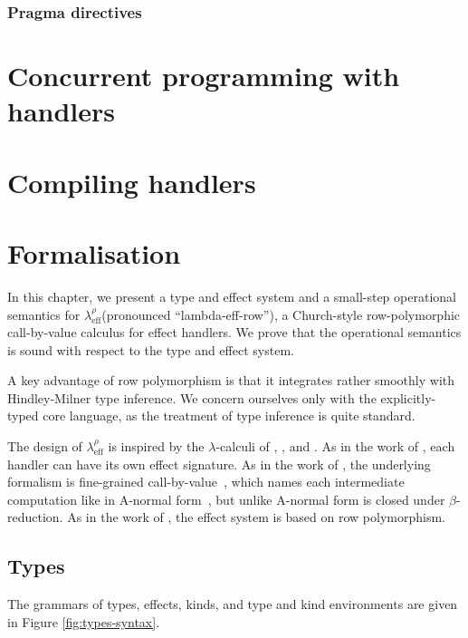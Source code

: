 \documentclass[mscres,icsa,lfcs,twoside,openright,logo,rightchapter,normalheadings]{infthesis}
\theoremstyle{definition}
\newcommand{\Calc}{\ensuremath{\lambda_{\text{eff}}^\rho}\xspace}
\begin{document}
\subsection{Pragma directives}


\chapter{Concurrent programming with handlers}

\chapter{Compiling handlers}

\chapter{Formalisation}
In this chapter, we present a type and effect system and a small-step
operational semantics for \Calc (pronounced ``lambda-eff-row''), a
Church-style row-polymorphic call-by-value calculus for effect
handlers.
%
We prove that the operational semantics is sound with respect to the
type and effect system.

A key advantage of row polymorphism is that it integrates rather
smoothly with Hindley-Milner type inference. We concern ourselves only
with the explicitly-typed core language, as the treatment of type
inference is quite standard.

The design of \Calc is inspired by the $\lambda$-calculi of
\citet{Kammar2013}, \citet{Pretnar2015}, and \citet{Lindley2012}.
%
As in the work of \citet{Kammar2013}, each handler can have its own
effect signature. As in the work of \citet{Pretnar2015}, the
underlying formalism is fine-grained call-by-value~\cite{LevyPT03},
which names each intermediate computation like in A-normal
form~\cite{Flanagan1993}, but unlike A-normal form is closed under
$\beta$-reduction. As in the work of \citet{Lindley2012}, the effect
system is based on row polymorphism.

\section{Types}
The grammars of types, effects, kinds, and type and kind environments
are given in Figure \ref{fig:types-syntax}.
\end{document}
